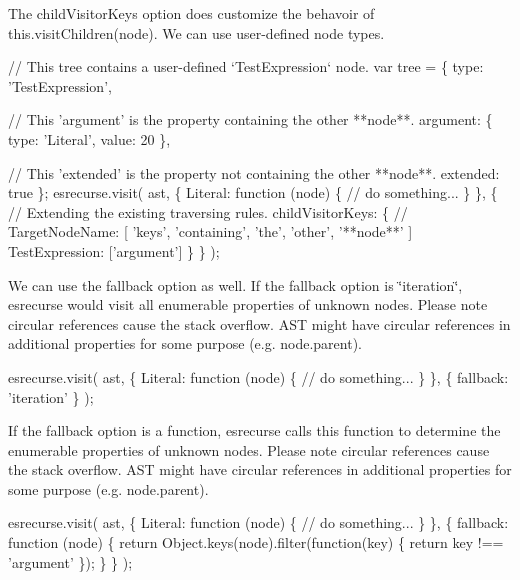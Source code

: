 The {\ttfamily child\+Visitor\+Keys} option does customize the behavoir of {\ttfamily this.\+visit\+Children(node)}. We can use user-\/defined node types.


\begin{DoxyCode}
// This tree contains a user-defined `TestExpression` node.
var tree = \{
    type: 'TestExpression',

    // This 'argument' is the property containing the other **node**.
    argument: \{
        type: 'Literal',
        value: 20
    \},

    // This 'extended' is the property not containing the other **node**.
    extended: true
\};
esrecurse.visit(
    ast,
    \{
        Literal: function (node) \{
            // do something...
        \}
    \},
    \{
        // Extending the existing traversing rules.
        childVisitorKeys: \{
            // TargetNodeName: [ 'keys', 'containing', 'the', 'other', '**node**' ]
            TestExpression: ['argument']
        \}
    \}
);
\end{DoxyCode}


We can use the {\ttfamily fallback} option as well. If the {\ttfamily fallback} option is {\ttfamily \char`\"{}iteration\char`\"{}}, {\ttfamily esrecurse} would visit all enumerable properties of unknown nodes. Please note circular references cause the stack overflow. A\+ST might have circular references in additional properties for some purpose (e.\+g. {\ttfamily node.\+parent}).


\begin{DoxyCode}
esrecurse.visit(
    ast,
    \{
        Literal: function (node) \{
            // do something...
        \}
    \},
    \{
        fallback: 'iteration'
    \}
);
\end{DoxyCode}


If the {\ttfamily fallback} option is a function, {\ttfamily esrecurse} calls this function to determine the enumerable properties of unknown nodes. Please note circular references cause the stack overflow. A\+ST might have circular references in additional properties for some purpose (e.\+g. {\ttfamily node.\+parent}).


\begin{DoxyCode}
esrecurse.visit(
    ast,
    \{
        Literal: function (node) \{
            // do something...
        \}
    \},
    \{
        fallback: function (node) \{
            return Object.keys(node).filter(function(key) \{
                return key !== 'argument'
            \});
        \}
    \}
);
\end{DoxyCode}


